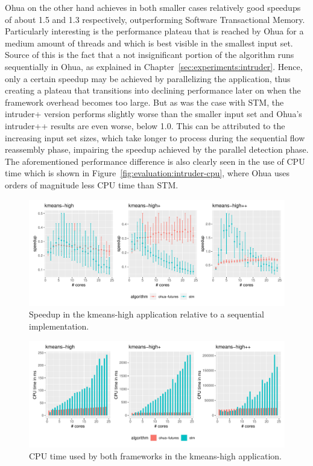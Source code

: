 Ohua on the other hand achieves in both smaller cases relatively good speedups of about 1.5 and 1.3 respectively, outperforming Software Transactional Memory.
Particularly interesting is the performance plateau that is reached by Ohua for a medium amount of threads and which is best visible in the smallest input set.
Source of this is the fact that a not insignificant portion of the algorithm runs sequentially in Ohua, as explained in Chapter~\ref{sec:experiments:intruder}.
Hence, only a certain speedup may be achieved by parallelizing the application, thus creating a plateau that transitions into declining performance later on when the framework overhead becomes too large.
But as was the case with STM, the intruder+ version performs slightly worse than the smaller input set and Ohua's intruder++ results are even worse, below 1.0.
This can be attributed to the increasing input set sizes, which take longer to process during the sequential flow reassembly phase, impairing the speedup achieved by the parallel detection phase.
The aforementioned performance difference is also clearly seen in the use of CPU time which is shown in Figure~\ref{fig:evaluation:intruder-cpu}, where Ohua uses orders of magnitude less CPU time than STM.

\begin{figure}
    \centering
    \includegraphics[width=\textwidth,keepaspectratio]{gfx/results/kmeans-high_comb}
    \caption{Speedup in the kmeans-high application relative to a sequential implementation.}%
    \label{fig:evaluation:kmeans-high}
\end{figure}

\begin{figure}
    \centering
    \includegraphics[width=\textwidth,keepaspectratio]{gfx/results/cpu_kmeans-high_comb}
    \caption{CPU time used by both frameworks in the kmeans-high application.}%
    \label{fig:evaluation:kmeans-high-cpu}
\end{figure}

